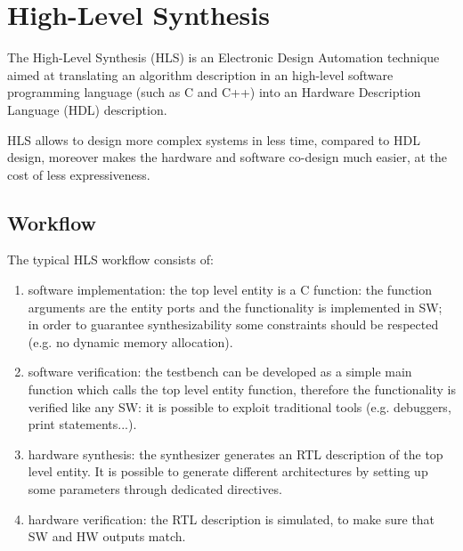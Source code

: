\documentclass[11pt,a4paper]{memoir}
\begin{document}
\section{High-Level Synthesis}
The High-Level Synthesis (HLS) is an Electronic Design Automation technique
aimed at translating an algorithm description in an high-level software
programming language (such as C and C++) into an Hardware Description Language
(HDL) description.

HLS allows to design more complex systems in less time, compared to HDL design,
moreover makes the hardware and software co-design much easier, at the cost of
less expressiveness.

\subsection{Workflow}
The typical HLS workflow consists of:
\begin{enumerate}
	\item software implementation: the top level entity is a C function:
		the function arguments are the entity ports and the functionality
		is implemented in SW; in order to guarantee synthesizability
		some constraints should be respected (e.g. no dynamic memory
		allocation).
	\item software verification: the testbench can be developed as a simple
		main function which calls the top level entity function,
		therefore the functionality is verified like any SW:
		it is possible to exploit traditional tools (e.g. debuggers,
		print statements...).
	\item hardware synthesis: the synthesizer generates an RTL description
		of the top level entity. It is possible to generate different
		architectures by setting up some parameters through dedicated
		directives.
	\item hardware verification: the RTL description is simulated, to make
		sure that SW and HW outputs match.
\end{enumerate}
\end{document}
